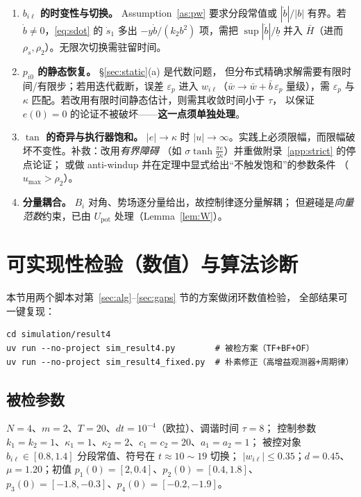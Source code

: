 \documentclass[11pt,a4paper]{article}
\newcommand{\ub}{\underline{b}}
\theoremstyle{plain}
\theoremstyle{definition}
\theoremstyle{remark}
\begin{document}
\begin{enumerate}[label=(\arabic*)]
\item \textbf{$b_{i\ell}$ 的时变性与切换。} Assumption~\ref{as:pw} 要求分段常值或
$|\dot b|/|b|$ 有界。若 $\dot b\neq0$，\eqref{eq:sdot} 的 $\dot s_1$ 多出
$-y\dot b/(k_2b^2)$ 项，需把 $\sup|\dot b|/\ub$ 并入 $\bar H$（进而
$\rho_s,\rho_2$）。无限次切换需驻留时间。

\item \textbf{$p_{i0}$ 的静态恢复。} §\ref{sec:static}(a) 是代数问题，
但分布式精确求解需要有限时间/有限步；若用迭代截断，误差 $\varepsilon_p$ 进入
$w_{i\ell}$（$\bar w\to\bar w+\bar b\,\varepsilon_p$ 量级），需 $\varepsilon_p$ 与
$\kappa$ 匹配。若改用有限时间静态估计，则需其收敛时间小于 $\tau$，
以保证 $e(0)=0$ 的论证不被破坏——\textbf{这一点须单独处理}。

\item \textbf{$\tan$ 的奇异与执行器饱和。}\label{rem:sat} $|e|\to\kappa$ 时
$|u|\to\infty$。实践上必须限幅，而限幅破坏不变性。补救：改用\emph{有界障碍}
（如 $\sigma\tanh\frac{\pi e}{2\kappa}$）并重做附录~\ref{app:strict} 的停点论证；
或做 anti-windup 并在定理中显式给出“不触发饱和”的参数条件
（$u_{\max}>\rho_2$）。

\item \textbf{分量耦合。} $B_i$ 对角、势场逐分量给出，故控制律逐分量解耦；
但避碰是\emph{向量范数}约束，已由 $U_{\mathrm{pot}}$ 处理（Lemma~\ref{lem:W}）。
\end{enumerate}

\section{可实现性检验（数值）与算法诊断}\label{sec:numeric}
本节用两个脚本对第~\ref{sec:alg}--\ref{sec:gaps} 节的方案做闭环数值检验，
全部结果可一键复现：
\begin{verbatim}
cd simulation/result4
uv run --no-project sim_result4.py        # 被检方案（TF+BF+OF）
uv run --no-project sim_result4_fixed.py  # 朴素修正（高增益观测器+周期律）
\end{verbatim}

\subsection{被检参数}
$N=4$、$m=2$、$T=20$、$dt=10^{-4}$（欧拉）、调谐时间 $\tau=8$；
控制参数 $k_1=k_2=1$、$\kappa_1=1$、$\kappa_2=2$、$c_1=c_2=20$、$a_1=a_2=1$；
被控对象 $b_{i\ell}\in[0.8,1.4]$ 分段常值、符号在 $t\approx10\sim19$ 切换；
$|w_{i\ell}|\le0.35$；$d=0.45$、$\mu=1.20$；初值
$p_1(0)=[2,0.4]$、$p_2(0)=[0.4,1.8]$、$p_3(0)=[-1.8,-0.3]$、$p_4(0)=[-0.2,-1.9]$。
\end{document}
